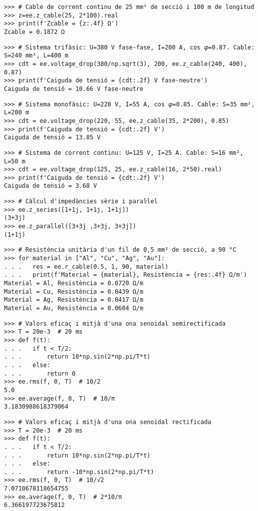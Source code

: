 \begin{lstlisting}
>>> # Cable de corrent continu de 25 mm² de secció i 100 m de longitud
>>> z=ee.z_cable(25, 2*100).real
>>> print(f'Zcable = {z:.4f} Ω')
Zcable = 0.1872 Ω	
\end{lstlisting}

\begin{lstlisting}
>>> # Sistema trifàsic: U=380 V fase-fase, I=200 A, cos 𝜑=0.87. Cable: S=240 mm², L=400 m
>>> cdt = ee.voltage_drop(380/np.sqrt(3), 200, ee.z_cable(240, 400), 0.87)
>>> print(f'Caiguda de tensió = {cdt:.2f} V fase-neutre')
Caiguda de tensió = 10.66 V fase-neutre
\end{lstlisting}

\begin{lstlisting}
>>> # Sistema monofàsic: U=220 V, I=55 A, cos 𝜑=0.85. Cable: S=35 mm², L=200 m
>>> cdt = ee.voltage_drop(220, 55, ee.z_cable(35, 2*200), 0.85)
>>> print(f'Caiguda de tensió = {cdt:.2f} V')
Caiguda de tensió = 13.85 V
\end{lstlisting}

\begin{lstlisting}
>>> # Sistema de corrent continu: U=125 V, I=25 A. Cable: S=16 mm², L=50 m
>>> cdt = ee.voltage_drop(125, 25, ee.z_cable(16, 2*50).real)
>>> print(f'Caiguda de tensió = {cdt:.2f} V')
Caiguda de tensió = 3.68 V
\end{lstlisting}

\begin{lstlisting}
>>> # Càlcul d'impedàncies sèrie i paraŀlel
>>> ee.z_series([1+1j, 1+1j, 1+1j])
(3+3j)
>>> ee.z_parallel([3+3j ,3+3j, 3+3j])
(1+1j)
\end{lstlisting}

\begin{lstlisting}
>>> # Resistència unitària d'un fil de 0,5 mm² de secció, a 90 °C 
>>> for material in ["Al", "Cu", "Ag", "Au"]:
. . .   res = ee.r_cable(0.5, 1, 90, material)
. . .   print(f'Material = {material}, Resistència = {res:.4f} Ω/m')
Material = Al, Resistència = 0.0720 Ω/m
Material = Cu, Resistència = 0.0439 Ω/m
Material = Ag, Resistència = 0.0417 Ω/m
Material = Au, Resistència = 0.0604 Ω/m        
\end{lstlisting}

\begin{lstlisting}
>>> # Valors eficaç i mitjà d'una ona senoidal semirectificada
>>> T = 20e-3  # 20 ms
>>> def f(t):
. . .   if t < T/2:
. . .       return 10*np.sin(2*np.pi/T*t)
. . .   else:
. . .       return 0
>>> ee.rms(f, 0, T)  # 10/2
5.0
>>> ee.average(f, 0, T)  # 10/π
3.1830988618379064
\end{lstlisting}

\begin{lstlisting}
>>> # Valors eficaç i mitjà d'una ona senoidal rectificada
>>> T = 20e-3  # 20 ms
>>> def f(t):
. . .   if t < T/2:
. . .       return 10*np.sin(2*np.pi/T*t)
. . .   else:
. . .       return -10*np.sin(2*np.pi/T*t)
>>> ee.rms(f, 0, T)  # 10/√2
7.0710678118654755
>>> ee.average(f, 0, T)  # 2*10/π
6.366197723675812
\end{lstlisting}


